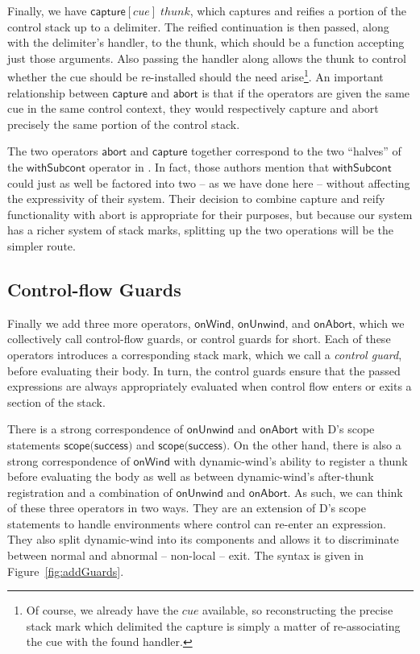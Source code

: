 \documentclass[11pt]{article}
\newcommand{\capture}[2]{\textsf{capture}[#1]\;#2}
\begin{document}
Finally, we have $\capture{cue}{thunk}$, which captures and reifies a portion of the control stack up to a delimiter.
The reified continuation is then passed, along with the delimiter's handler, to the thunk, which should be a function accepting just those arguments.
Also passing the handler along allows the thunk to control whether the cue should be re-installed should the need arise\footnote{Of course, we already have the $cue$ available, so reconstructing the precise stack mark which delimited the capture is simply a matter of re-associating the cue with the found handler.}.
An important relationship between $\textsf{capture}$ and $\textsf{abort}$ is that if the operators are given the same cue in the same control context, they would respectively capture and abort precisely the same portion of the control stack.

The two operators $\textsf{abort}$ and $\textsf{capture}$ together correspond to the two ``halves'' of the $\textsf{withSubcont}$ operator in \cite{MFDC}.
In fact, those authors mention that $\textsf{withSubcont}$ could just as well be factored into two -- as we have done here -- without affecting the expressivity of their system.
Their decision to combine capture and reify functionality with abort is appropriate for their purposes, but because our system has a richer system of stack marks, splitting up the two operations will be the simpler route.

\subsection{Control-flow Guards}

Finally we add three more operators, $\textsf{onWind}$, $\textsf{onUnwind}$, and $\textsf{onAbort}$, which we collectively call control-flow guards, or control guards for short.
Each of these operators introduces a corresponding stack mark, which we call a \emph{control guard}, before evaluating their body.
In turn, the control guards ensure that the passed expressions are always appropriately evaluated when control flow enters or exits a section of the stack.

There is a strong correspondence of $\textsf{onUnwind}$ and $\textsf{onAbort}$ with D's scope statements $\textsf{scope(success)}$ and $\textsf{scope(success)}$.
On the other hand, there is also a strong correspondence of $\textsf{onWind}$ with dynamic-wind's ability to register a thunk before evaluating the body as well as between dynamic-wind's after-thunk registration and a combination of $\textsf{onUnwind}$ and $\textsf{onAbort}$.
As such, we can think of these three operators in two ways.
They are an extension of D's scope statements to handle environments where control can re-enter an expression.
They also split dynamic-wind into its components and allows it to discriminate between normal and abnormal -- non-local -- exit.
The syntax is given in Figure~\ref{fig:addGuards}.
\end{document}
